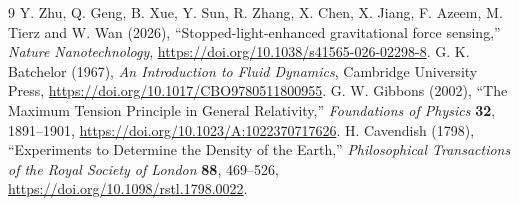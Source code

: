 \documentclass[11pt,a4paper]{article}
\begin{document}
\begin{thebibliography}{9}
Y. Zhu, Q. Geng, B. Xue, Y. Sun, R. Zhang, X. Chen, X. Jiang, F. Azeem, M. Tierz and W. Wan (2026), ``Stopped-light-enhanced gravitational force sensing,'' \emph{Nature Nanotechnology}, \url{https://doi.org/10.1038/s41565-026-02298-8}.
 G. K. Batchelor (1967), \emph{An Introduction to Fluid Dynamics}, Cambridge University Press, \url{https://doi.org/10.1017/CBO9780511800955}.
 G. W. Gibbons (2002), ``The Maximum Tension Principle in General Relativity,'' \emph{Foundations of Physics} \textbf{32}, 1891--1901, \url{https://doi.org/10.1023/A:1022370717626}.
 H. Cavendish (1798), ``Experiments to Determine the Density of the Earth,'' \emph{Philosophical Transactions of the Royal Society of London} \textbf{88}, 469--526, \url{https://doi.org/10.1098/rstl.1798.0022}.
\end{thebibliography}
\end{document}
